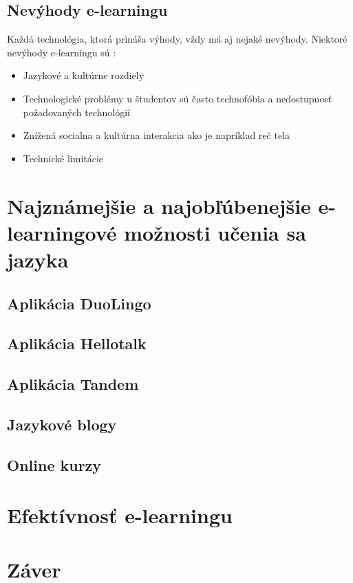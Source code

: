 \documentclass[10pt,twoside,slovak,a4paper]{article}
\begin{document}
\subsection{Nevýhody e-learningu}
Každá technológia, ktorá prináša výhody, vždy má aj nejaké nevýhody. Niektoré nevýhody e-learningu sú :\\
\begin{itemize}
\item Jazykové a kultúrne rozdiely \cite{efektivnost}
\item Technologické problémy u študentov sú často technofóbia a nedostupnosť požadovaných technológií \cite{nevyhody}
\item Znížená socialna a kultúrna interakcia ako je napríklad reč tela \cite{nevyhody}
\item Technické limitácie\cite{efektivnost}
\end{itemize}

\section{Najznámejšie a najobľúbenejšie e-learningové možnosti učenia sa jazyka}

\subsection{Aplikácia DuoLingo}

\subsection{Aplikácia Hellotalk}

\subsection{Aplikácia Tandem}

\subsection{Jazykové blogy}

\subsection{Online kurzy}

\section{Efektívnosť e-learningu}

\section{Záver}



\end{document}
